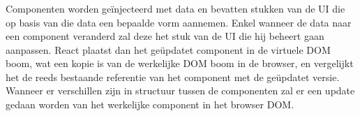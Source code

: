 \subsubsection{}
\label{sec:virtualDOM}

Componenten worden geïnjecteerd met data en bevatten stukken van de UI die op basis van die data een bepaalde vorm aannemen. Enkel wanneer de data naar een component veranderd zal deze het stuk van de UI die hij beheert gaan aanpassen. React plaatst dan het geüpdatet component in de virtuele DOM boom, wat een kopie is van de werkelijke DOM boom in de browser, en vergelijkt het de reeds bestaande referentie van het component met de geüpdatet versie. Wanneer er verschillen zijn in structuur tussen de componenten zal er een update gedaan worden van het werkelijke component in het browser DOM.

\section{}
\label{sec:toolsOplossingen}

\subsection{}
\label{sec:webpack}

\subsection{}
\label{sec:ssr}
            
